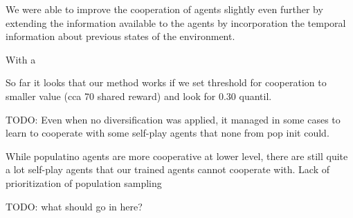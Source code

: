 We were able to improve the cooperation of agents slightly even further by extending the information available to the agents by incorporation the temporal information about previous states of the environment.

With a




So far it looks that our method works if we set threshold for cooperation to smaller value (cca 70 shared reward) and look for 0.30 quantil.


TODO: Even when no diversification was applied, it managed in some cases to learn to cooperate with some self-play agents that none from pop init could.

While populatino agents are more cooperative at lower level, there are still quite a lot self-play agents that our trained agents cannot cooperate with.
Lack of prioritization of population sampling


{\color{blue}TODO: what should go in here?}

